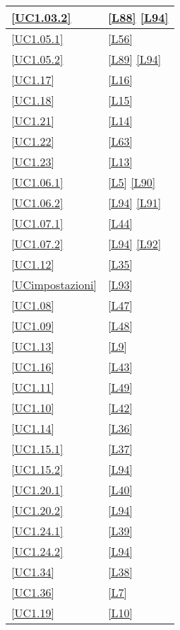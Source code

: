 \begin{longtable}{|P{6cm}|P{6cm}|}
	\hline \ref{UC1.03.2} & \ref{L88} \linebreak \ref{L94} \\
	\hline \ref{UC1.05.1} & \ref{L56} \\
	\hline \ref{UC1.05.2} & \ref{L89} \linebreak \ref{L94} \\
	\hline \ref{UC1.17} & \ref{L16} \\
	\hline \ref{UC1.18} & \ref{L15} \\
	\hline \ref{UC1.21} & \ref{L14} \\
	\hline \ref{UC1.22} & \ref{L63} \\
	\hline \ref{UC1.23} & \ref{L13} \\
	\hline \ref{UC1.06.1} & \ref{L5} \linebreak \ref{L90} \\
	\hline \ref{UC1.06.2} & \ref{L94} \linebreak \ref{L91} \\
	\hline \ref{UC1.07.1} & \ref{L44} \\
	\hline \ref{UC1.07.2} & \ref{L94} \linebreak \ref{L92} \\
	\hline \ref{UC1.12} & \ref{L35} \\
	\hline \ref{UCimpostazioni} & \ref{L93} \\
	\hline \ref{UC1.08} & \ref{L47} \\
	\hline \ref{UC1.09} & \ref{L48} \\
	\hline \ref{UC1.13} & \ref{L9} \\	
	\hline \ref{UC1.16} & \ref{L43} \\
	\hline \ref{UC1.11} & \ref{L49} \\	
	\hline \ref{UC1.10} & \ref{L42} \\
	\hline \ref{UC1.14} & \ref{L36} \\
	\hline \ref{UC1.15.1} & \ref{L37} \\
	\hline \ref{UC1.15.2} & \ref{L94} \\
	\hline \ref{UC1.20.1} & \ref{L40} \\
	\hline \ref{UC1.20.2} & \ref{L94} \\
	\hline \ref{UC1.24.1} & \ref{L39} \\
	\hline \ref{UC1.24.2} & \ref{L94} \\
	\hline \ref{UC1.34} & \ref{L38} \\
	\hline \ref{UC1.36} & \ref{L7} \\	
	\hline \ref{UC1.19} & \ref{L10} \\

\end{longtable}
